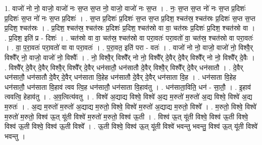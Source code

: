 \documentclass[17pt]{extarticle}
\begin{document}
1. वाजो॑ नो नो॒ वाजो॒ वाजो॑ नः स॒प्त स॒प्त नो॒ वाजो॒ वाजो॑ नः स॒प्त । . नः॒ स॒प्त स॒प्त नो॑ नः स॒प्त प्र॒दिशः॑ प्र॒दिशः॑ स॒प्त नो॑ नः स॒प्त प्र॒दिशः॑ । . स॒प्त प्र॒दिशः॑ प्र॒दिशः॑ स॒प्त स॒प्त प्र॒दिश॒ श्चत॑स्र॒ श्चत॑स्रः प्र॒दिशः॑ स॒प्त स॒प्त प्र॒दिश॒ श्चत॑स्रः । . प्र॒दिश॒ श्चत॑स्र॒ श्चत॑स्रः प्र॒दिशः॑ प्र॒दिश॒ श्चत॑स्रो वा वा॒ चत॑स्रः प्र॒दिशः॑ प्र॒दिश॒ श्चत॑स्रो वा । . प्र॒दिश॒ इति॑ प्र - दिशः॑ । . चत॑स्रो वा वा॒ चत॑स्र॒ श्चत॑स्रो वा परा॒वतः॑ परा॒वतो॑ वा॒ चत॑स्र॒ श्चत॑स्रो वा परा॒वतः॑ । . वा॒ प॒रा॒वतः॑ परा॒वतो॑ वा वा परा॒वतः॑ । . प॒रा॒वत॒ इति॑ परा - वतः॑ । . वाजो॑ नो नो॒ वाजो॒ वाजो॑ नो॒ विश्वै॒र् विश्वै᳚र् नो॒ वाजो॒ वाजो॑ नो॒ विश्वैः᳚ । . नो॒ विश्वै॒र् विश्वै᳚र् नो नो॒ विश्वै᳚र् दे॒वैर् दे॒वैर् विश्वै᳚र् नो नो॒ विश्वै᳚र् दे॒वैः । . विश्वै᳚र् दे॒वैर् दे॒वैर् विश्वै॒र् विश्वै᳚र् दे॒वैर् धन॑सातौ॒ धन॑सातौ दे॒वैर् विश्वै॒र् विश्वै᳚र् दे॒वैर् धन॑सातौ । . दे॒वैर् धन॑सातौ॒ धन॑सातौ दे॒वैर् दे॒वैर् धन॑साता वि॒हेह धन॑सातौ दे॒वैर् दे॒वैर् धन॑साता वि॒ह । . धन॑साता वि॒हेह धन॑सातौ॒ धन॑साता वि॒हाव॑ त्वव त्वि॒ह धन॑सातौ॒ धन॑साता वि॒हाव॑तु । . धन॑साता॒विति॒ धन॑ - सा॒तौ॒ । . इ॒हाव॑ त्ववत्वि॒ हेहाव॑तु । . अ॒व॒त्वित्य॑वतु । . विश्वे॑ अ॒द्याद्य विश्वे॒ विश्वे॑ अ॒द्य म॒रुतो॑ म॒रुतो॑ अ॒द्य विश्वे॒ विश्वे॑ अ॒द्य म॒रुतः॑ । . अ॒द्य म॒रुतो॑ म॒रुतो॑ अ॒द्याद्य म॒रुतो॒ विश्वे॒ विश्वे॑ म॒रुतो॑ अ॒द्याद्य म॒रुतो॒ विश्वे᳚ । . म॒रुतो॒ विश्वे॒ विश्वे॑ म॒रुतो॑ म॒रुतो॒ विश्व॑ ऊ॒त् यू॑ती विश्वे॑ म॒रुतो॑ म॒रुतो॒ विश्व॑ ऊ॒ती । . विश्व॑ ऊ॒त् यू॑ती विश्वे॒ विश्व॑ ऊ॒ती विश्वे॒ विश्व॑ ऊ॒ती विश्वे॒ विश्व॑ ऊ॒ती विश्वे᳚ । . ऊ॒ती विश्वे॒ विश्व॑ ऊ॒त् यू॑ती विश्वे॑ भवन्तु भवन्तु॒ विश्व॑ ऊ॒त् यू॑ती विश्वे॑ भवन्तु । \newline
\end{document}

